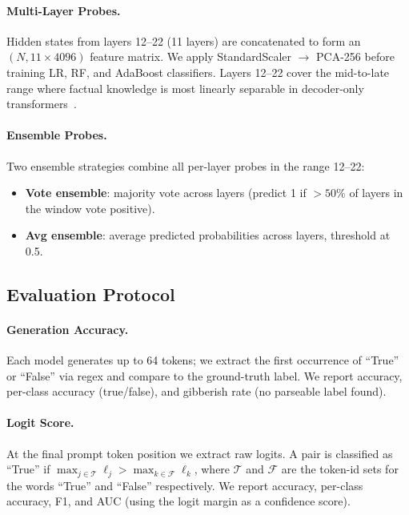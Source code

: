 \paragraph{Multi-Layer Probes.}
Hidden states from layers 12--22 (11 layers) are concatenated to form an
$(N, 11{\times}4096)$ feature matrix.
We apply StandardScaler $\to$ PCA-256 before training LR, RF, and AdaBoost
classifiers.
Layers 12--22 cover the mid-to-late range where factual knowledge is most linearly
separable in decoder-only transformers~\citep{meng2022locating}.

\paragraph{Ensemble Probes.}
Two ensemble strategies combine all per-layer probes in the range 12--22:
\begin{itemize}[leftmargin=1.5em, itemsep=2pt]
    \item \textbf{Vote ensemble}: majority vote across layers (predict 1 if $>50\%$
    of layers in the window vote positive).
    \item \textbf{Avg ensemble}: average predicted probabilities across layers,
    threshold at 0.5.
\end{itemize}

\subsection{Evaluation Protocol}

\paragraph{Generation Accuracy.}
Each model generates up to 64 tokens; we extract the first occurrence of ``True''
or ``False'' via regex and compare to the ground-truth label.
We report accuracy, per-class accuracy (true/false), and gibberish rate (no
parseable label found).

\paragraph{Logit Score.}
At the final prompt token position we extract raw logits.
A pair is classified as ``True'' if $\max_{j \in \mathcal{T}}\ell_j > \max_{k \in
\mathcal{F}}\ell_k$, where $\mathcal{T}$ and $\mathcal{F}$ are the token-id sets
for the words ``True'' and ``False'' respectively.
We report accuracy, per-class accuracy, F1, and AUC (using the logit margin as a
confidence score).

